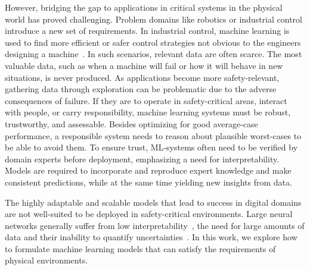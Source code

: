 However, bridging the gap to applications in critical systems in the physical world has proved challenging.
Problem domains like robotics or industrial control introduce a new set of requirements.
In industrial control, machine learning is used to find more efficient or safer control strategies not obvious to the engineers designing a machine~\parencite{hein_benchmark_2017}.
In such scenarios, relevant data are often scarce.
The most valuable data, such as when a machine will fail or how it will behave in new situations, is never produced.
As applications become more safety-relevant, gathering data through exploration can be problematic due to the adverse consequences of failure.
If they are to operate in safety-critical areas, interact with people, or carry responsibility, machine learning systems must be robust, trustworthy, and assessable.
Besides optimizing for good average-case performance, a responsible system needs to reason about plausible worst-cases to be able to avoid them.
To ensure trust, ML-systems often need to be verified by domain experts before deployment, emphasizing a need for interpretability.
Models are required to incorporate and reproduce expert knowledge and make consistent predictions, while at the same time yielding new insights from data.

The highly adaptable and scalable models that lead to success in digital domains are not well-suited to be deployed in safety-critical environments.
Large neural networks generally suffer from low interpretability~\parencite{rudin_stop_2019}, the need for large amounts of data and their inability to quantify uncertainties~\parencite{goodfellow_deep_2016}.
In this work, we explore how to formulate machine learning models that can satisfy the requirements of physical environments.


